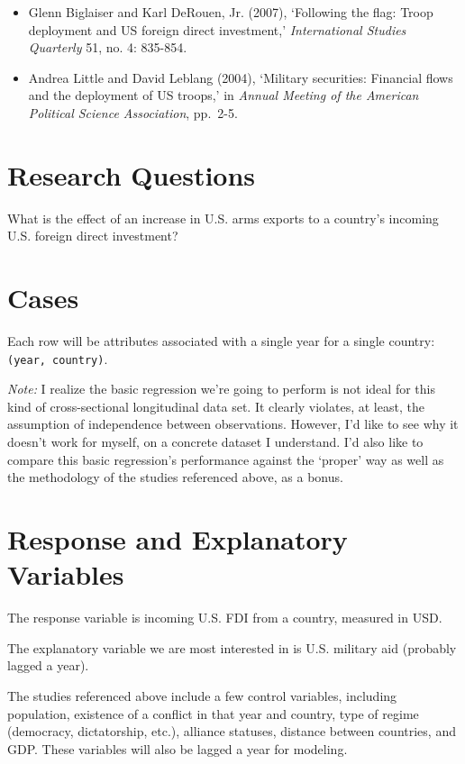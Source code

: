 \documentclass[12pt,]{article}
\begin{document}
\begin{itemize}
\item
  Glenn Biglaiser and Karl DeRouen, Jr. (2007), `Following the flag:
  Troop deployment and US foreign direct investment,'
  \emph{International Studies Quarterly} 51, no. 4: 835-854.
\item
  Andrea Little and David Leblang (2004), `Military securities:
  Financial flows and the deployment of US troops,' in \emph{Annual
  Meeting of the American Political Science Association}, pp.~2-5.
\end{itemize}

\hypertarget{research-questions}{%
\section{Research Questions}\label{research-questions}}

What is the effect of an increase in U.S. arms exports to a country's
incoming U.S. foreign direct investment?

\hypertarget{cases}{%
\section{Cases}\label{cases}}

Each row will be attributes associated with a single year for a single
country: \texttt{(year,\ country)}.

\emph{Note:} I realize the basic regression we're going to perform is
not ideal for this kind of cross-sectional longitudinal data set. It
clearly violates, at least, the assumption of independence between
observations. However, I'd like to see why it doesn't work for myself,
on a concrete dataset I understand. I'd also like to compare this basic
regression's performance against the `proper' way as well as the
methodology of the studies referenced above, as a bonus.

\hypertarget{response-and-explanatory-variables}{%
\section{Response and Explanatory
Variables}\label{response-and-explanatory-variables}}

The response variable is incoming U.S. FDI from a country, measured in
USD.

The explanatory variable we are most interested in is U.S. military aid
(probably lagged a year).

The studies referenced above include a few control variables, including
population, existence of a conflict in that year and country, type of
regime (democracy, dictatorship, etc.), alliance statuses, distance
between countries, and GDP. These variables will also be lagged a year
for modeling.
\end{document}
